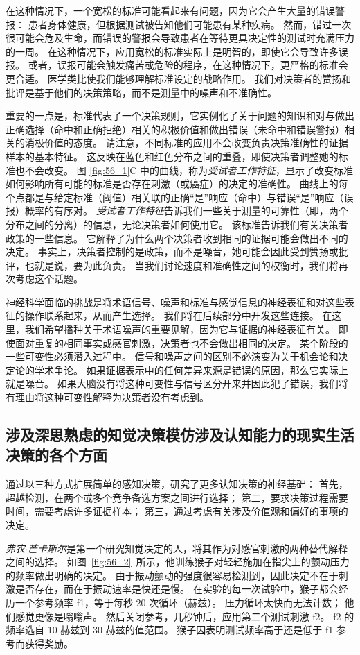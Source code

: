 在这种情况下，一个宽松的标准可能看起来有问题，因为它会产生大量的错误警报：
患者身体健康，但根据测试被告知他们可能患有某种疾病。
然而，错过一次很可能会危及生命，而错误的警报会导致患者在等待更具决定性的测试时充满压力的一周。
在这种情况下，应用宽松的标准实际上是明智的，即使它会导致许多误报。
或者，误报可能会触发痛苦或危险的程序，在这种情况下，更严格的标准会更合适。
医学类比使我们能够理解标准设定的战略作用。
我们对决策者的赞扬和批评是基于他们的决策策略，而不是测量中的噪声和不准确性。


重要的一点是，标准代表了一个决策规则，它实例化了关于问题的知识和对与做出正确选择（命中和正确拒绝）相关的积极价值和做出错误（未命中和错误警报）相关的消极价值的态度。
请注意，不同标准的应用不会改变负责决策准确性的证据样本的基本特征。
这反映在蓝色和红色分布之间的重叠，即使决策者调整她的标准也不会改变。
图 \ref{fig:56_1}C 中的曲线，称为\textit{受试者工作特征}，显示了改变标准如何影响所有可能的标准是否存在刺激（或癌症）的决定的准确性。
曲线上的每个点都是与给定标准（阈值）相关联的正确“是”响应（命中）与错误“是”响应（误报）概率的有序对。
\textit{受试者工作特征}告诉我们一些关于测量的可靠性（即，两个分布之间的分离）的信息，无论决策者如何使用它。
该标准告诉我们有关决策者政策的一些信息。
它解释了为什么两个决策者收到相同的证据可能会做出不同的决定。
事实上，决策者控制的是政策，而不是噪音，她可能会因此受到赞扬或批评，也就是说，要为此负责。
当我们讨论速度和准确性之间的权衡时，我们将再次考虑这个话题。


神经科学面临的挑战是将术语信号、噪声和标准与感觉信息的神经表征和对这些表征的操作联系起来，从而产生选择。
我们将在后续部分中开发这些连接。
在这里，我们希望播种关于术语噪声的重要见解，因为它与证据的神经表征有关。
即使面对重复的相同事实或感官刺激，决策者也不会做出相同的决定。
某个阶段的一些可变性必须潜入过程中。
信号和噪声之间的区别不必演变为关于机会论和决定论的学术争论。
如果证据表示中的任何差异来源是错误的原因，那么它实际上就是噪音。
如果大脑没有将这种可变性与信号区分开来并因此犯了错误，我们将有理由将这种可变性解释为决策者没有考虑到。


\subsection{涉及深思熟虑的知觉决策模仿涉及认知能力的现实生活决策的各个方面}

通过以三种方式扩展简单的感知决策，研究了更多认知决策的神经基础：
首先，超越检测，在两个或多个竞争备选方案之间进行选择；
第二，要求决策过程需要时间，需要考虑许多证据样本； 第三，通过考虑有关涉及价值观和偏好的事项的决定。


\textit{弗农$\cdot$芒卡斯尔}是第一个研究知觉决定的人，将其作为对感官刺激的两种替代解释之间的选择。
如图~\ref{fig:56_2}~所示，他训练猴子对轻轻施加在指尖上的颤动压力的频率做出明确的决定。
由于振动颤动的强度很容易检测到，因此决定不在于刺激是否存在，而在于振动速率是快还是慢。
在实验的每一次试验中，猴子都会经历一个参考频率 f1，等于每秒 20 次循环（赫兹）。
压力循环太快而无法计数； 他们感觉更像是嗡嗡声。
然后关闭参考，几秒钟后，应用第二个测试刺激 f2。
f2 的频率选自 10 赫兹到 30 赫兹的值范围。
猴子因表明测试频率高于还是低于 f1 参考而获得奖励。


